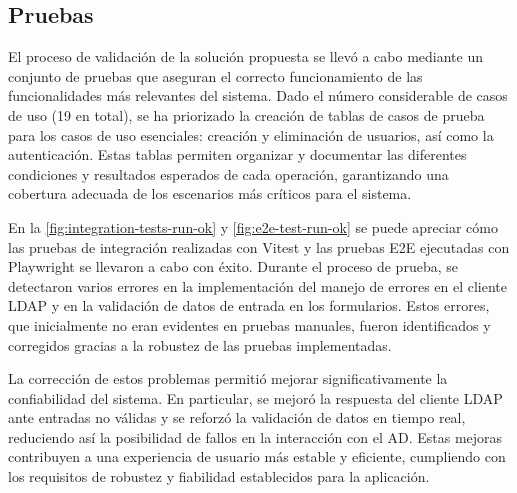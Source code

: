 \subsection{Pruebas}

El proceso de validación de la solución propuesta se llevó a cabo mediante un conjunto de pruebas que aseguran el correcto funcionamiento de las funcionalidades más relevantes del sistema. Dado el número considerable de casos de uso (19 en total), se ha priorizado la creación de tablas de casos de prueba para los casos de uso esenciales: creación y eliminación de usuarios, así como la autenticación. Estas tablas permiten organizar y documentar las diferentes condiciones y resultados esperados de cada operación, garantizando una cobertura adecuada de los escenarios más críticos para el sistema.


En la \autoref{fig:integration-tests-run-ok} y \autoref{fig:e2e-test-run-ok} se puede apreciar cómo las pruebas de integración realizadas con Vitest y las pruebas E2E ejecutadas con Playwright se llevaron a cabo con éxito. Durante el proceso de prueba, se detectaron varios errores en la implementación del manejo de errores en el cliente LDAP y en la validación de datos de entrada en los formularios. Estos errores, que inicialmente no eran evidentes en pruebas manuales, fueron identificados y corregidos gracias a la robustez de las pruebas implementadas.

La corrección de estos problemas permitió mejorar significativamente la confiabilidad del sistema. En particular, se mejoró la respuesta del cliente LDAP ante entradas no válidas y se reforzó la validación de datos en tiempo real, reduciendo así la posibilidad de fallos en la interacción con el AD. Estas mejoras contribuyen a una experiencia de usuario más estable y eficiente, cumpliendo con los requisitos de robustez y fiabilidad establecidos para la aplicación.
